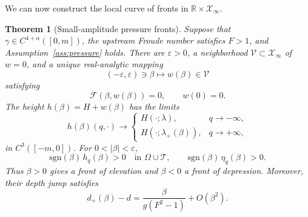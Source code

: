\documentclass[12pt,letterpaper]{amsart}
\newtheorem{theorem}{Theorem}[section]
\numberwithin{equation}{section}
\def\R{{\mathbb R}}
\begin{document}
	{We can now construct the local curve of fronts in $\R\times\mathscr X_\infty$.}
\begin{theorem}[Small-amplitude pressure fronts]\label{thm:local}
	{Suppose that $\gamma\in C^{4+\alpha}([0,m])$, the upstream Froude number satisfies $F>1$, and Assumption~\ref{ass:pressure} holds.}  There are \(\varepsilon>0\), a neighborhood
	\(\mathcal V\subset\mathscr X_\infty\) of~ \(w=0\), and a unique real-analytic mapping
	\[
	(-\varepsilon,\varepsilon)\ni\beta\longmapsto w(\beta)\in\mathcal V
	\]
	{satisfying}
	\[
	\mathcal F(\beta,w(\beta))=0,\qquad w(0)=0.
	\]
	The height \(h(\beta)=H+w(\beta)\) has the limits
	\[
	h(\beta)(q,\cdot)\longrightarrow
	\begin{cases}
		H(\cdot;\lambda),&q\to-\infty,\\
		H(\cdot;\lambda_+(\beta)),&q\to+\infty,
	\end{cases}
	\]
	in \(C^3([-m,0])\).  For \(0<|\beta|<\varepsilon\),
	\begin{equation*}
		\mathrm{sgn}(\beta)\,h_q(\beta)>0
		\quad\text{in }\Omega\cup\mathcal T,
		\qquad
		\mathrm{sgn}(\beta)\,\eta_q(\beta)>0.
	\end{equation*}
	Thus \(\beta>0\) gives a front of elevation and \(\beta<0\) a front of
	depression. Moreover, their depth jump satisfies
	\begin{equation}\label{eq:local-depth-expansion}
		d_+(\beta)-d
		=\frac{\beta}{g(F^2-1)}+O(\beta^2).
	\end{equation}
\end{theorem}
\end{document}
